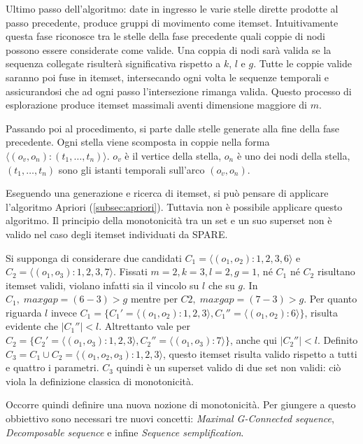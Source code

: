 Ultimo passo dell'algoritmo: date in ingresso le varie stelle dirette prodotte al passo precedente, produce gruppi di movimento come itemset.
Intuitivamente questa fase riconosce tra le stelle della fase precedente quali coppie di nodi possono essere considerate come valide.
Una coppia di nodi sarà valida se la sequenza collegate risulterà significativa rispetto a \(k\), \(l\) e \(g\).
Tutte le coppie valide saranno poi fuse in itemset, intersecando ogni volta le sequenze temporali e assicurandosi che ad ogni passo l'intersezione rimanga valida.
Questo processo di esplorazione produce itemset massimali aventi dimensione maggiore di \(m\).

Passando poi al procedimento, si parte dalle stelle generate alla fine della fase precedente.
Ogni stella viene scomposta in coppie nella forma \(\langle(o_v, o_n):(t_1, \ldots, t_n)\rangle\).
\(o_v\) è il vertice della stella, \(o_n\) è uno dei nodi della stella, \((t_1, \ldots, t_n)\) sono gli istanti temporali sull'arco \((o_v, o_n)\).

Eseguendo una generazione e ricerca di itemset, si può pensare di applicare l'algoritmo Apriori (\cref{subsec:apriori}).
Tuttavia non è possibile applicare questo algoritmo.
Il principio della monotonicità tra un set e un suo superset non è valido nel caso degli itemset individuati da SPARE.

Si supponga di considerare due candidati \(C_1 = \langle(o_1, o_2): 1,2,3,6\rangle\) e \(C_2 = \langle(o_1, o_3): 1,2,3,7\rangle\).
Fissati \(m = 2, k = 3, l = 2, g = 1\), né \(C_1\) né \(C_2\) risultano itemset validi, violano infatti sia il vincolo su \(l\) che su \(g\).
In \(C_1,\; maxgap = (6-3) > g\) mentre per \(C2, \; maxgap = (7-3) > g\).
Per quanto riguarda \(l\) invece \(C_1 = \{C_1' = \langle(o_1, o_2): 1,2,3\rangle, C_1'' = \langle(o_1, o_2):6\rangle\}\), risulta evidente che \(|C_1''| < l\).
Altrettanto vale per \(C_2 = \{C_2' = \langle(o_1, o_3): 1,2,3\rangle, C_2'' = \langle(o_1, o_3):7\rangle\}\), anche qui \(|C_2''| < l\).
Definito \( C_3 = C_1 \cup C_2 = \langle(o_1, o_2, o_3): 1,2,3\rangle\), questo itemset risulta valido rispetto a tutti e quattro i parametri.
\(C_3\) quindi è un superset valido di due set non validi: ciò viola la definizione classica di monotonicità.

Occorre quindi definire una nuova nozione di monotonicità.
Per giungere a questo obbiettivo sono necessari tre nuovi concetti: \textit{Maximal G-Connected sequence}, \textit{Decomposable sequence} e infine \textit{Sequence semplification}.

